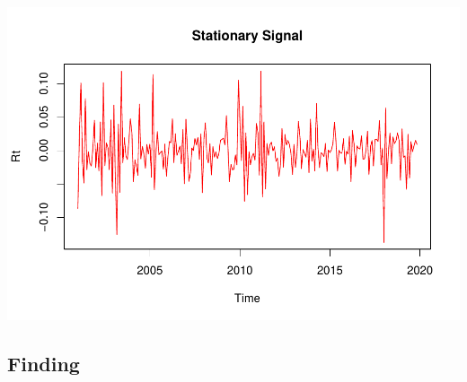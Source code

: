 \documentclass[10pt]{report}
\begin{document}
\includegraphics{unnamed-chunk-18-1.pdf}

\hypertarget{finding}{%
\subsection{Finding}\label{finding}}
\end{document}
